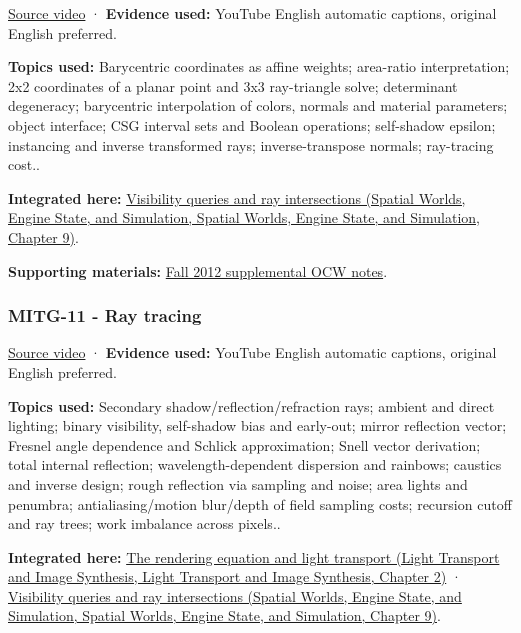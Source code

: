 \href{https://www.youtube.com/watch?v=gDayCevuE-U}{Source video} · \textbf{Evidence used:} YouTube English automatic captions, original English preferred.

\textbf{Topics used:} Barycentric coordinates as affine weights; area-ratio interpretation; 2x2 coordinates of a planar point and 3x3 ray-triangle solve; determinant degeneracy; barycentric interpolation of colors, normals and material parameters; object interface; CSG interval sets and Boolean operations; self-shadow epsilon; instancing and inverse transformed rays; inverse-transpose normals; ray-tracing cost..

\textbf{Integrated here:} \href{../05-Spatial-Worlds-Engine-State-and-Simulation/main.pdf\#nameddest=04-visual-computing-ii-ch028-visibility-queries-and-ray-intersections-1}{Visibility queries and ray intersections (Spatial Worlds, Engine State, and Simulation, Spatial Worlds, Engine State, and Simulation, Chapter 9)}.

\textbf{Supporting materials:} \href{https://ocw.mit.edu/courses/6-837-computer-graphics-fall-2012/pages/lecture-notes/}{Fall 2012 supplemental OCW notes}.

\subsubsection{MITG-11 - Ray tracing}\label{04-visual-computing-ii-ch036-mitg-11---ray-tracing}

\href{https://www.youtube.com/watch?v=UL54Rf2O9RM}{Source video} · \textbf{Evidence used:} YouTube English automatic captions, original English preferred.

\textbf{Topics used:} Secondary shadow/reflection/refraction rays; ambient and direct lighting; binary visibility, self-shadow bias and early-out; mirror reflection vector; Fresnel angle dependence and Schlick approximation; Snell vector derivation; total internal reflection; wavelength-dependent dispersion and rainbows; caustics and inverse design; rough reflection via sampling and noise; area lights and penumbra; antialiasing/motion blur/depth of field sampling costs; recursion cutoff and ray trees; work imbalance across pixels..

\textbf{Integrated here:} \href{../04-Light-Transport-and-Image-Synthesis/main.pdf\#nameddest=03-visual-computing-i-ch007-the-rendering-equation-and-light-transport}{The rendering equation and light transport (Light Transport and Image Synthesis, Light Transport and Image Synthesis, Chapter 2)} · \href{../05-Spatial-Worlds-Engine-State-and-Simulation/main.pdf\#nameddest=04-visual-computing-ii-ch028-visibility-queries-and-ray-intersections-1}{Visibility queries and ray intersections (Spatial Worlds, Engine State, and Simulation, Spatial Worlds, Engine State, and Simulation, Chapter 9)}.

